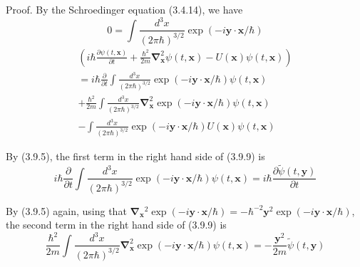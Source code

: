 \documentclass{article}
\begin{document}
Proof. By the Schroedinger equation (3.4.14), we have
$$
\begin{equation*}
0=\int \frac{d^{3} x}{(2 \pi \hbar)^{3 / 2}} \exp (-i \boldsymbol{y} \cdot \boldsymbol{x} / \hbar) \tag{3.9.9}
\end{equation*}
$$
$$
\begin{array}{r}
\left(i \hbar \frac{\partial \psi(t, \boldsymbol{x})}{\partial t}+\frac{\hbar^{2}}{2 m} \boldsymbol{\nabla}_{\boldsymbol{x}}^{2} \psi(t, \boldsymbol{x})-U(\boldsymbol{x}) \psi(t, \boldsymbol{x})\right) \\
=i \hbar \frac{\partial}{\partial t} \int \frac{d^{3} x}{(2 \pi \hbar)^{3 / 2}} \exp (-i \boldsymbol{y} \cdot \boldsymbol{x} / \hbar) \psi(t, \boldsymbol{x}) \\
+\frac{\hbar^{2}}{2 m} \int \frac{d^{3} x}{(2 \pi \hbar)^{3 / 2}} \boldsymbol{\nabla}_{\boldsymbol{x}}^{2} \exp (-i \boldsymbol{y} \cdot \boldsymbol{x} / \hbar) \psi(t, \boldsymbol{x}) \\
-\int \frac{d^{3} x}{(2 \pi \hbar)^{3 / 2}} \exp (-i \boldsymbol{y} \cdot \boldsymbol{x} / \hbar) U(\boldsymbol{x}) \psi(t, \boldsymbol{x})
\end{array}
$$

By (3.9.5), the first term in the right hand side of (3.9.9) is
$$
\begin{equation*}
i \hbar \frac{\partial}{\partial t} \int \frac{d^{3} x}{(2 \pi \hbar)^{3 / 2}} \exp (-i \boldsymbol{y} \cdot \boldsymbol{x} / \hbar) \psi(t, \boldsymbol{x})=i \hbar \frac{\partial \tilde{\psi}(t, \boldsymbol{y})}{\partial t} \tag{3.9.10}
\end{equation*}
$$

By (3.9.5) again, using that $\boldsymbol{\nabla}_{\boldsymbol{x}}{ }^{2} \exp (-i \boldsymbol{y} \cdot \boldsymbol{x} / \hbar)=-\hbar^{-2} \boldsymbol{y}^{2} \exp (-i \boldsymbol{y} \cdot \boldsymbol{x} / \hbar)$, the second term in the right hand side of (3.9.9) is
$$
\begin{equation*}
\frac{\hbar^{2}}{2 m} \int \frac{d^{3} x}{(2 \pi \hbar)^{3 / 2}} \boldsymbol{\nabla}_{\boldsymbol{x}}^{2} \exp (-i \boldsymbol{y} \cdot \boldsymbol{x} / \hbar) \psi(t, \boldsymbol{x})=-\frac{\boldsymbol{y}^{2}}{2 m} \tilde{\psi}(t, \boldsymbol{y}) \tag{3.9.11}
\end{equation*}
$$
\end{document}
